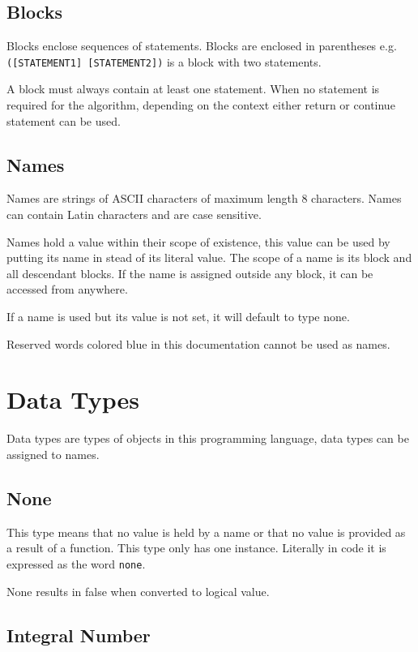 \documentclass[a4paper,11pt,openany]{article}
\begin{document}
\subsection{Blocks}

Blocks enclose sequences of statements. Blocks are enclosed in parentheses e.g.\\ \texttt{([STATEMENT1] [STATEMENT2])} is a block with two statements.

A block must always contain at least one statement. When no statement is required for the algorithm, depending on the context either return or continue statement can be used.

\subsection{Names}

Names are strings of ASCII characters of maximum length 8 characters. Names can contain Latin characters and are case sensitive.

Names hold a value within their scope of existence, this value can be used by putting its name in stead of its literal value. The scope of a name is its block and all descendant blocks. If the name is assigned outside any block, it can be accessed from anywhere.

If a name is used but its value is not set, it will default to type none.

Reserved words colored blue in this documentation cannot be used as names.
	
\section{Data Types}

Data types are types of objects in this programming language, data types can be assigned to names. 

\subsection{None}

This type means that no value is held by a name or that no value is provided as a result of a function. This type only has one instance. Literally in code it is expressed as the word \texttt{\color{blue!60!black}none}.

None results in false when converted to logical value.

\subsection{Integral Number}
\end{document}
